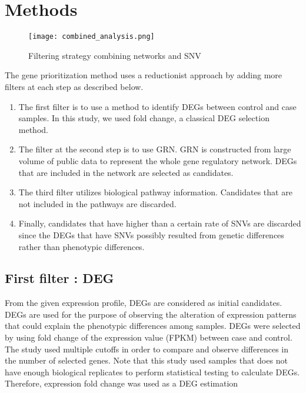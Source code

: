 \documentclass[oneside,phd]{snuthesis}
\begin{document}
\section{Methods}
\begin{figure*}
\begin{center}
\texttt{[image: combined\_analysis.png]}
\end{center}
\caption{Filtering strategy combining networks and SNV}
\label{combined_analysis}
\end{figure*}
The gene prioritization method uses a reductionist approach by adding more filters at each step as described below.
\begin{enumerate}
\item The first filter is to use a method to identify DEGs between control and case samples. In this study, we used fold change, a classical DEG selection method.
\item The filter at the second step is to use GRN. GRN is constructed from large volume of public data to represent the whole gene regulatory network. DEGs that are included in the network are selected as candidates.
\item The third filter utilizes biological pathway information. 
Candidates that are not included in the pathways are discarded.
\item Finally, candidates that have higher than a certain rate of SNVs are discarded since the DEGs that have SNVs possibly resulted from genetic differences rather than phenotypic differences.
\end{enumerate}

\subsection{First filter : DEG}

From the given expression profile, DEGs are considered as initial candidates.
DEGs are used for the purpose of observing the alteration of expression patterns that could explain the phenotypic differences among samples.
DEGs were selected by using fold change of the expression value (FPKM) between case and control. 
The study used multiple cutoffs in order to compare and observe differences in the number of selected genes.
Note that this study used samples that does not have enough biological replicates to perform statistical testing to calculate DEGs. Therefore, expression fold change was used as a DEG estimation
\end{document}
